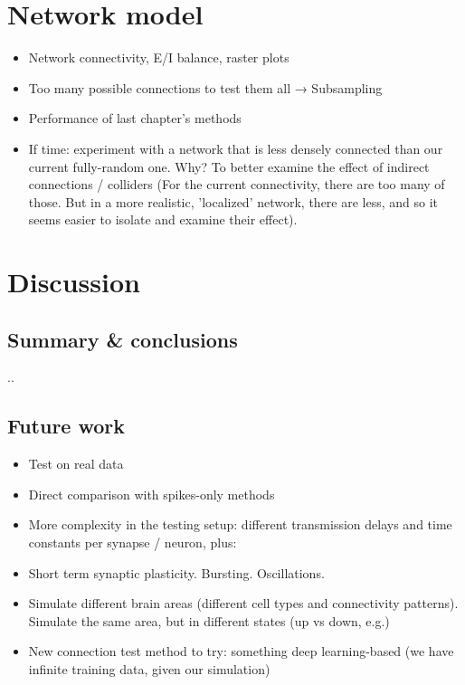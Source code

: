 \documentclass[a4paper, oneside, 11pt]{memoir}
\begin{document}
\chapter{Network model}

\begin{itemize}
    \item Network connectivity, E/I balance, raster plots
    \item Too many possible connections to test them all → Subsampling
    \item Performance of last chapter's methods
    \item If time: experiment with a network that is less densely connected than our current fully-random one. Why? To better examine the effect of indirect connections / colliders (For the current connectivity, there are too many of those. But in a more realistic, 'localized' network, there are less, and so it seems easier to isolate and examine their effect).
\end{itemize}


\chapter{Discussion}

\section{Summary \& conclusions}

..

\section{Future work}

\begin{itemize}
    \item Test on real data
    \item Direct comparison with spikes-only methods
    \item More complexity in the testing setup: different transmission delays and time constants per synapse / neuron, plus:
    \item Short term synaptic plasticity. Bursting. Oscillations.
    \item Simulate different brain areas (different cell types and connectivity patterns). Simulate the same area, but in different states (up vs down, e.g.)
    \item New connection test method to try: something deep learning-based (we have infinite training data, given our simulation)
\end{itemize}

\References
\end{document}
